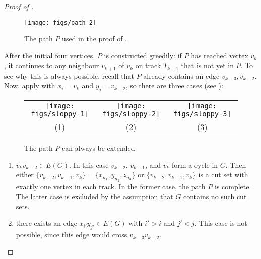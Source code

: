 \documentclass{patmorin}
\begin{document}
\begin{proof}[Proof of ]
  
  \begin{figure}
     \begin{center}
        \texttt{[image: figs/path-2]}
     \end{center}
     \caption{The path $P$ used in the proof of .}
  \end{figure}

  After the initial four vertices, $P$ is constructed greedily: if $P$
  has reached vertex $v_k$, it continues to any neighbour $v_{k+1}$
  of $v_k$ on track $T_{k+1}$ that is not yet in $P$.  
  To see why this is always possible,
  recall that $P$ already contains an edge $v_{k-3},v_{k-2}$. Now,
  apply  with $x_i=v_k$ and $y_j=v_{k-2}$, so there
  are three cases (see ):

\begin{figure}
   \begin{center}
     \begin{tabular}{ccc}
       \texttt{[image: figs/sloppy-1]} &
       \texttt{[image: figs/sloppy-2]} &
       \texttt{[image: figs/sloppy-3]} \\
       (1) & (2) & (3) 
     \end{tabular}
   \end{center}
   \caption{The path $P$ can always be extended.}
\end{figure}


  \begin{enumerate}
  \item $v_k v_{k-2}\in E(G)$.  In this
  case $v_{k-2}$, $v_{k-1}$, and $v_k$ form a cycle in $G$.  Then either
  $\{v_{k-2},v_{k-1},v_{k}\}=\{x_{n_1},y_{n_2},z_{n_3}\}$ or
  $\{v_{k-2},v_{k-1},v_{k}\}$ is a cut set with exactly one vertex in
  each track.  In the former case, the path $P$ is complete. The latter case is excluded by the assumption that $G$ contains no such cut sets.

  \item there exists an edge $x_{i'}y_{j'}\in E(G)$ with $i' > i$ and $j'< j$.  This case is not possible, since this edge would cross $v_{k-3}v_{k-2}$.


\end{enumerate}
\end{proof}
\end{document}
